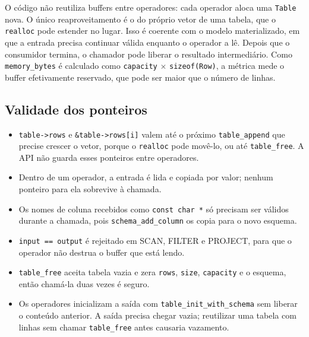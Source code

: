\documentclass[11pt,a4paper]{article}
\begin{document}
O código não reutiliza buffers entre operadores: cada operador aloca uma \texttt{Table} nova. O único reaproveitamento é o do próprio vetor de uma tabela, que o \texttt{realloc} pode estender no lugar. Isso é coerente com o modelo materializado, em que a entrada precisa continuar válida enquanto o operador a lê. Depois que o consumidor termina, o chamador pode liberar o resultado intermediário. Como \texttt{memory\_bytes} é calculado como \texttt{capacity} $\times$ \texttt{sizeof(Row)}, a métrica mede o buffer efetivamente reservado, que pode ser maior que o número de linhas.

\subsection{Validade dos ponteiros}
\begin{itemize}
    \item \texttt{table->rows} e \texttt{\&table->rows[i]} valem até o próximo \texttt{table\_append} que precise crescer o vetor, porque o \texttt{realloc} pode movê-lo, ou até \texttt{table\_free}. A API não guarda esses ponteiros entre operadores.
    \item Dentro de um operador, a entrada é lida e copiada por valor; nenhum ponteiro para ela sobrevive à chamada.
    \item Os nomes de coluna recebidos como \texttt{const char *} só precisam ser válidos durante a chamada, pois \texttt{schema\_add\_column} os copia para o novo esquema.
    \item \texttt{input == output} é rejeitado em SCAN, FILTER e PROJECT, para que o operador não destrua o buffer que está lendo.
    \item \texttt{table\_free} aceita tabela vazia e zera \texttt{rows}, \texttt{size}, \texttt{capacity} e o esquema, então chamá-la duas vezes é seguro.
    \item Os operadores inicializam a saída com \texttt{table\_init\_with\_schema} sem liberar o conteúdo anterior. A saída precisa chegar vazia; reutilizar uma tabela com linhas sem chamar \texttt{table\_free} antes causaria vazamento.
\end{itemize}
\end{document}
